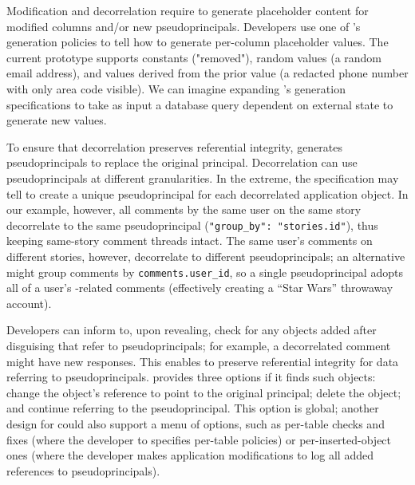Modification and decorrelation require \sys to generate placeholder content for
modified columns and/or new pseudoprincipals.  Developers use one of \sys's
generation policies to tell \sys how to generate per-column placeholder values.
%
The current prototype supports constants (\eg "removed"), random values (\eg a
random email address), and values derived from the prior value (\eg a redacted
phone number with only area code visible).
%
We can imagine expanding \sys's generation specifications to take as input a
database query dependent on external state to generate new values.
%


%
To ensure that decorrelation preserves referential integrity, \sys generates
pseudoprincipals to replace the original principal. 
%
Decorrelation can use pseudoprincipals at different granularities.
In the extreme, the \xx specification may tell \sys to create a unique
pseudoprincipal for each decorrelated application object.
In our example, however, all comments by the same user on the same story
decorrelate to the same pseudoprincipal (\verb+"group_by": "stories.id"+), thus
keeping same-story comment threads intact.
%
The same user's comments on different stories, however, decorrelate to different pseudoprincipals; an alternative might group comments by
\texttt{comments.user\_id}, so a single pseudoprincipal adopts all of a user's
-related comments (effectively creating a ``Star Wars'' throwaway account).

Developers can inform \sys to, upon revealing, check for any objects
added after disguising that refer to pseudoprincipals; for example, a
decorrelated comment might have new responses. This enables \sys to preserve
referential integrity for data referring to pseudoprincipals. \sys
provides three options if it finds such objects: \one{} change the object's
reference to point to the original principal; \two{} delete the object; and
\three{} continue referring to the pseudoprincipal.
%
This option is global; another design for \sys could also support a menu of
options, such as per-table checks and fixes (where the developer to specifies
per-table policies) or per-inserted-object ones (where the developer makes
application modifications to log all added references to pseudoprincipals).


%
%
%
%
%
%
%
%


